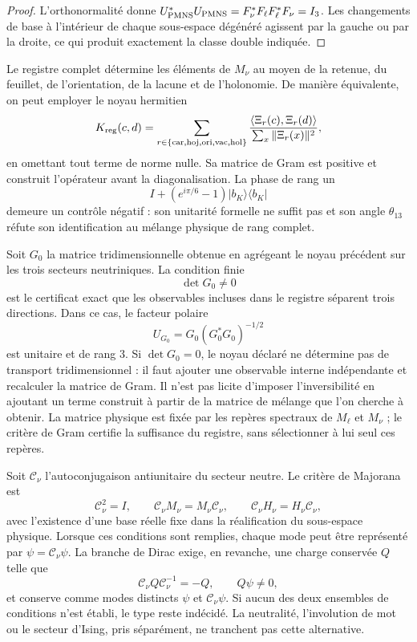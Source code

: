 \begin{proof}
L'orthonormalité donne
\(U_{\rm PMNS}^*U_{\rm PMNS}=F_\nu^*F_\ell F_\ell^*F_\nu=I_3\).
Les changements de base à l'intérieur de chaque sous-espace dégénéré agissent par la
gauche ou par la droite, ce qui produit exactement la classe double
indiquée.
\end{proof}

Le registre complet détermine les éléments de \(M_\nu\) au moyen de la retenue,
du feuillet, de l'orientation, de la lacune et de l'holonomie. De manière équivalente, on peut employer
le noyau hermitien
\[
 K_{\rm reg}(c,d)
 =\sum_{r\in\{\rm car,hoj,ori,vac,hol\}}
 \frac{\langle\Xi_r(c),\Xi_r(d)\rangle}
      {\sum_x\|\Xi_r(x)\|^2},
\]
en omettant tout terme de norme nulle. Sa matrice de Gram est positive et
construit l'opérateur avant la diagonalisation. La phase de rang un
\[
 I+(e^{i\pi/6}-1)|b_K\rangle\langle b_K|
\]
demeure un contrôle négatif : son unitarité formelle ne suffit pas et son angle
\(\theta_{13}\) réfute son identification au mélange physique de rang
complet.

Soit \(G_0\) la matrice tridimensionnelle obtenue en agrégeant le noyau précédent
sur les trois secteurs neutriniques. La condition finie
\[
 \det G_0\ne0
\]
est le certificat exact que les observables incluses dans le registre
séparent trois directions. Dans ce cas, le facteur polaire
\[
 U_{G_0}=G_0(G_0^*G_0)^{-1/2}
\]
est unitaire et de rang \(3\). Si \(\det G_0=0\), le noyau déclaré ne
détermine pas de transport tridimensionnel : il faut ajouter une observable interne
indépendante et recalculer la matrice de Gram. Il n'est pas licite d'imposer
l'inversibilité en ajoutant un terme construit à partir de la matrice de mélange
que l'on cherche à obtenir. La matrice physique est fixée par les repères
spectraux de \(M_\ell\) et \(M_\nu\) ; le critère de Gram certifie la suffisance
du registre, sans sélectionner à lui seul ces repères.

Soit \(\mathcal C_\nu\) l'autoconjugaison antiunitaire du secteur neutre. Le
critère de Majorana est
\[
 \mathcal C_\nu^2=I,
 \qquad
 \mathcal C_\nu M_\nu=M_\nu\mathcal C_\nu,
 \qquad
 \mathcal C_\nu H_\nu=H_\nu\mathcal C_\nu,
\]
avec l'existence d'une base réelle fixe dans la réalification du
sous-espace physique. Lorsque ces conditions sont remplies, chaque mode peut
être représenté par \(\psi=\mathcal C_\nu\psi\). La branche de Dirac exige, en
revanche, une charge conservée \(Q\) telle que
\[
 \mathcal C_\nu Q\mathcal C_\nu^{-1}=-Q,
 \qquad Q\psi\ne0,
\]
et conserve comme modes distincts \(\psi\) et \(\mathcal C_\nu\psi\). Si aucun
des deux ensembles de conditions n'est établi, le type reste indécidé.
La neutralité, l'involution de mot ou le secteur d'Ising, pris
séparément, ne tranchent pas cette alternative.

